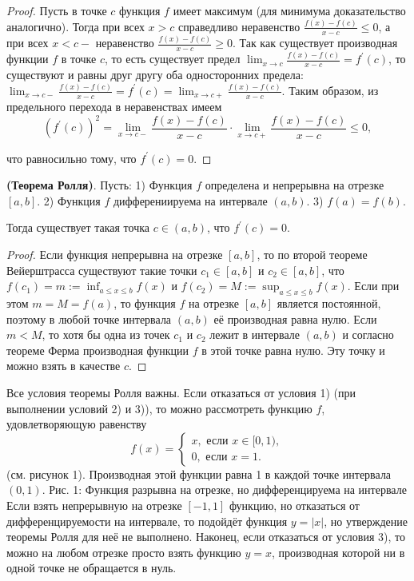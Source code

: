\begin{proof}
    Пусть в точке $c$ функция $f$ имеет максимум (для минимума доказательство аналогично). Тогда при всех $x>c$ справедливо неравенство $\frac{f(x)-f(c)}{x-c} \leq 0$, а при всех $x<c-$ неравенство $\frac{f(x)-f(c)}{x-c} \geq 0$. Так как существует производная функции $f$ в точке $c$, то есть существует предел $\lim _{x \rightarrow c} \frac{f(x)-f(c)}{x-c}=f^{\prime}(c)$, то существуют и равны друг другу оба односторонних предела: $\lim _{x \rightarrow c-} \frac{f(x)-f(c)}{x-c}=f^{\prime}(c)=\lim _{x \rightarrow c+} \frac{f(x)-f(c)}{x-c}$. Таким образом, из предельного перехода в неравенствах имеем
    $$
        \left(f^{\prime}(c)\right)^2=\lim _{x \rightarrow c-} \frac{f(x)-f(c)}{x-c} \cdot \lim _{x \rightarrow c+} \frac{f(x)-f(c)}{x-c} \leq 0,
    $$

    что равносильно тому, что $f^{\prime}(c)=0$.
\end{proof}

\begin{theorem} \textbf{(Теорема Ролля)}.
    Пусть:
    1) Функция $f$ определена и непрерывна на отрезке $[a, b]$.
    2) Функция $f$ дифферениируема на интервале $(a, b)$.
    3) $f(a)=f(b)$.

    Тогда существует такая точка $c \in(a, b)$, что $f^{\prime}(c)=0$.
\end{theorem}

\begin{proof}
    Если функция непрерывна на отрезке $[a, b]$, то по второй теореме Вейерштрасса существуют такие точки $c_1 \in[a, b]$ и $c_2 \in[a, b]$, что $f\left(c_1\right)=m:=\inf _{a \leq x \leq b} f(x)$ и $f\left(c_2\right)=M:=\sup _{a \leq x \leq b} f(x)$. Если при этом $m=M=f(a)$, то функция $f$ на отрезке $[a, b]$ является постоянной, поэтому в любой точке интервала $(a, b)$ её производная равна нулю. Если $m<M$, то хотя бы одна из точек $c_1$ и $c_2$ лежит в интервале $(a, b)$ и согласно теореме Ферма производная функции $f$ в этой точке равна нулю. Эту точку и можно взять в качестве $c$.
\end{proof}

Все условия теоремы Ролля важны. Если отказаться от условия 1) (при выполнении условий 2) и 3)), то можно рассмотреть функцию $f$, удовлетворяющую равенству
$$
    f(x)=\left\{\begin{array}{l}
        x, \text { если } x \in[0,1), \\
        0, \text { если } x=1 .
    \end{array}\right.
$$
(см. рисунок 1). Производная этой функции равна 1 в каждой точке интервала $(0,1)$.
Рис. 1: Функция разрывна на отрезке, но дифференцируема на интервале
Если взять непрерывную на отрезке $[-1,1]$ функцию, но отказаться от дифференцируемости на интервале, то подойдёт функция $y=|x|$, но утверждение теоремы Ролля для неё не выполнено. Наконец, если отказаться от условия 3), то можно на любом отрезке просто взять функцию $y=x$, производная которой ни в одной точке не обращается в нуль.
\newpage

